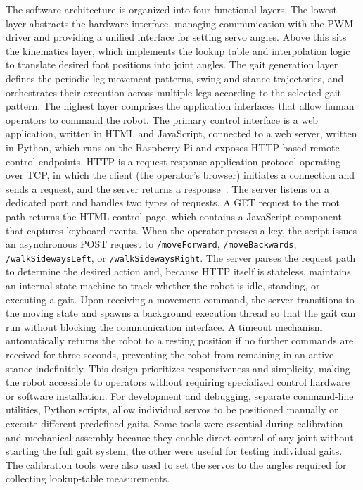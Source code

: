 \documentclass[a4paper,12pt]{report}
\begin{document}
The software architecture is organized into four functional layers. The lowest layer abstracts the
hardware interface, managing communication with the PWM driver and providing a unified interface for
setting servo angles. Above this sits the kinematics layer, which implements the lookup table and
interpolation logic to translate desired foot positions into joint angles. The gait generation layer
defines the periodic leg movement patterns, swing and stance trajectories, and orchestrates
their execution across multiple legs according to the selected gait pattern.
The highest layer comprises the application interfaces that allow human operators to command
the robot. The primary control interface is a web application, written in HTML and JavaScript,
connected to a web server, written in Python, which runs on the Raspberry Pi and exposes HTTP-based
remote-control endpoints. HTTP is a request-response application protocol operating over TCP, in
which the client (the operator's browser) initiates a connection and sends a request, and the server
returns a response~\parencite{fielding2022}. The server listens on a dedicated port and handles two
types of requests. A GET request to the root path returns the HTML control page, which contains a
JavaScript component that captures keyboard events. When the operator presses a key, the script
issues an asynchronous POST request to \texttt{/moveForward}, \texttt{/moveBackwards},
\texttt{/walkSidewaysLeft}, or \texttt{/walkSidewaysRight}. The server parses the request path to
determine the desired action and, because HTTP itself is stateless, maintains an internal state
machine to track whether the robot is idle, standing, or executing a gait. Upon receiving a movement
command, the server transitions to the moving state and spawns a background execution thread so that
the gait can run without blocking the communication interface. A timeout mechanism automatically
returns the robot to a resting position if no further commands are received for three seconds,
preventing the robot from remaining in an active stance indefinitely. This design prioritizes
responsiveness and simplicity, making the robot accessible to operators without requiring
specialized control hardware or software installation. For development and debugging, separate
command-line utilities, Python scripts, allow individual servos to be positioned manually or execute
different predefined gaits. Some tools were essential during calibration and mechanical assembly
because they enable direct control of any joint without starting the full gait system, the other
were useful for testing individual gaits. The calibration tools were also used to set the servos to
the angles required for collecting lookup-table measurements.
\end{document}

